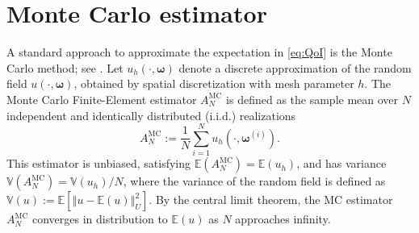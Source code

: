 \section{Monte Carlo estimator}\label{sec:MC}

A standard approach to approximate the expectation in \eqref{eq:QoI} is the Monte Carlo method; see \cite{ElLiSa:2023,Gi:2008,Gi:2015,PeWiGu:2016}. Let $u_h (\cdot, \boldsymbol{\omega})$ denote a discrete approximation of the random field $u(\cdot, \boldsymbol{\omega})$, obtained by spatial discretization with mesh parameter $h$. The Monte Carlo Finite-Element estimator $A^{\text{MC}}_{N}$ is defined as the sample mean over $N$ independent and identically distributed (i.i.d.) realizations 
%
\begin{equation}\label{eq:MC_estimator}
    A^{\text{MC}}_{N} := \frac{1}{N}\sum_{i=1}^{N} u_{h}\left(\cdot, \boldsymbol{\omega}^{(i)}\right).
\end{equation}
%
This estimator is unbiased, satisfying $\mathbb{E}(A^{\text{MC}}_{N}) = \mathbb{E}(u_{h})$, and has variance $\mathbb{V}(A^{\text{MC}}_{N}) = \mathbb{V}( u_{h})/{N}$, where the variance of the random field is defined as $\mathbb{V}(u) := \mathbb{E}[\left\Vert u - \mathbb{E}(u)\right\Vert_U^2]$. By the central limit theorem, the MC estimator $A^{\text{MC}}_{N}$ converges in distribution to $\mathbb{E}(u)$ as $N$ approaches infinity. 

